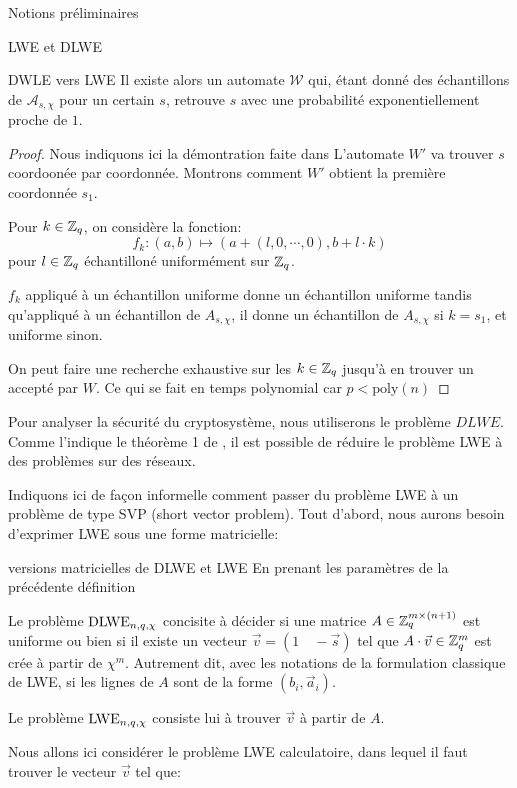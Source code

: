 \begin{section}{Notions préliminaires}
\begin{subsection}{LWE et DLWE}
\begin{prop}{DWLE vers LWE}
	Il existe alors un automate $\mathcal{W}$ qui, étant donné 
	des échantillons de $\mathcal{A}_{s,\chi}$ pour un certain $s$,
	retrouve $s$ avec une probabilité exponentiellement proche de $1$.
	\end{prop}
	\begin{proof}
	Nous indiquons ici la démontration faite dans \cite{STOC:Regev05}
	L'automate $W'$ va trouver $s$ coordoonée par coordonnée.  
	Montrons comment $W'$ obtient la première coordonnée $s_1$.

	Pour $k \in \mathbb{Z}_q$, on considère la fonction:
	\[f_k: (a,b) \mapsto (a + (l, 0, \cdots, 0), b + l \cdot k) \]
	pour $l\in \mathbb{Z}_q$ échantilloné uniformément sur $\mathbb{Z}_q$.

	$f_k$ appliqué à un échantillon uniforme donne un échantillon 
	uniforme tandis qu'appliqué à un échantillon de $A_{s, \chi}$,
	il donne un échantillon de $A_{s, \chi}$ si $k = s_1$, et uniforme 
	sinon.

	On peut faire une recherche exhaustive sur les $k \in \mathbb{Z}_q$ 
	jusqu'à en trouver un accepté par $W$. Ce qui se fait 
	en temps polynomial car $p < \text{poly}(n)$
	\end{proof}

	Pour analyser la sécurité du cryptosystème, nous utiliserons le
	problème $DLWE$. 
	Comme l'indique le théorème 1 de \cite{C:GenSahWat13}, il est
	possible de réduire le problème LWE à des problèmes sur des réseaux.


	Indiquons ici de façon informelle comment passer du problème LWE à un 
	problème de type SVP (short vector problem).
	Tout d'abord, nous aurons besoin d'exprimer LWE sous une forme
	matricielle:

	\begin{definition}{versions matricielles de DLWE et LWE}
	En prenant les paramètres de la précédente définition

	Le problème $\text{DLWE}_{n,q,\chi}$ concisite à décider 
	si une matrice $A \in \mathbb{Z}_q^{m \times (n+1)}$ 
	est uniforme ou bien si il existe un vecteur $\vec{v} = (1\quad
	-\vec{s})$ tel que $A \cdot \vec{v} \in \mathbb{Z}_q^{m}$ est 
	crée à partir de $\chi^m$. Autrement dit, avec les notations de 
	la formulation classique de LWE, si les lignes de $A$ sont de la forme
		$(b_i, \vec{a}_i)$. 

	Le problème $\text{LWE}_{n,q,\chi}$ consiste lui à trouver $\vec{v}$ à partir de $A$.
	\end{definition}



	Nous allons ici considérer le problème LWE calculatoire, dans lequel il
	faut trouver le vecteur $\vec{v}$ tel que:


\end{subsection}
\end{section}
